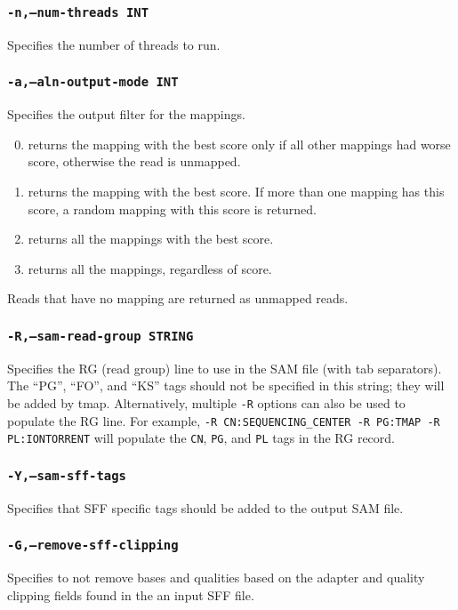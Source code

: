 \documentclass[a4paper,12pt]{book}
\newcommand{\TT}[1]{{\tt #1}} %
\begin{document}
\subsubsection{\TT{-n,--num-threads INT}}
Specifies the number of threads to run.

\subsubsection{\TT{-a,--aln-output-mode INT}}
Specifies the output filter for the mappings.
\begin{enumerate}
	\setcounter{enumi}{-1} %
	\item returns the mapping with the best score only if all other mappings had worse score, otherwise the read is unmapped.
	\item returns the mapping with the best score.  
		If more than one mapping has this score, a random mapping with this score is returned.
	\item returns all the mappings with the best score.
	\item returns all the mappings, regardless of score.
\end{enumerate}
Reads that have no mapping are returned as unmapped reads.

\subsubsection{\TT{-R,--sam-read-group STRING}}
Specifies the RG (read group) line to use in the SAM file (with tab separators).
The ``PG'', ``FO'', and ``KS'' tags should not be specified in this string; they will be added by tmap.
Alternatively, multiple \TT{-R} options can also be used to populate the RG line. 
For example, \TT{-R CN:SEQUENCING\_CENTER -R PG:TMAP -R PL:IONTORRENT} will populate the \TT{CN}, \TT{PG}, and \TT{PL} tags in the RG record.

\subsubsection{\TT{-Y,--sam-sff-tags}}
Specifies that SFF specific tags should be added to the output SAM file.

\subsubsection{\TT{-G,--remove-sff-clipping}}
Specifies to not remove bases and qualities based on the adapter and quality clipping fields found in the an input SFF file.
\end{document}
